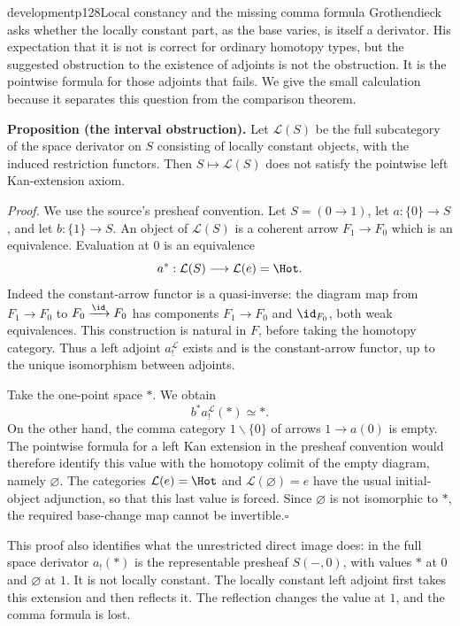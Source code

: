 \begin{dcomment}{development}{p128}{Local constancy and the missing comma formula}
Grothendieck asks whether the locally constant part, as the base varies, is itself a derivator. His expectation that it is not is correct for ordinary homotopy types, but the suggested obstruction to the existence of adjoints is not the obstruction. It is the pointwise formula for those adjoints that fails. We give the small calculation because it separates this question from the comparison theorem.

\textbf{Proposition (the interval obstruction).}\ours
Let $\mathcal L(S)$ be the full subcategory of the space derivator on $S$ consisting of locally constant objects, with the induced restriction functors. Then $S\mapsto\mathcal L(S)$ does not satisfy the pointwise left Kan-extension axiom.

\textit{Proof.} We use the source's presheaf convention. Let $S=(0\to1)$, let $a:\{0\}\to S$, and let $b:\{1\}\to S$. An object of $\mathcal L(S)$ is a coherent arrow $F_1\to F_0$ which is an equivalence. Evaluation at $0$ is an equivalence
\[
 a^*:\mathcal L(S)\longrightarrow\mathcal L(e)=\Hot.
\]
Indeed the constant-arrow functor is a quasi-inverse: the diagram map from $F_1\to F_0$ to $F_0\xrightarrow{\id}F_0$ has components $F_1\to F_0$ and $\id_{F_0}$, both weak equivalences. This construction is natural in $F$, before taking the homotopy category. Thus a left adjoint $a^{\mathcal L}_!$ exists and is the constant-arrow functor, up to the unique isomorphism between adjoints.

Take the one-point space $*$. We obtain
\[
 b^*a^{\mathcal L}_!(*)\simeq *.
\]
On the other hand, the comma category $1\backslash\{0\}$ of arrows $1\to a(0)$ is empty. The pointwise formula for a left Kan extension in the presheaf convention would therefore identify this value with the homotopy colimit of the empty diagram, namely $\varnothing$. The categories $\mathcal L(e)=\Hot$ and $\mathcal L(\varnothing)=e$ have the usual initial-object adjunction, so that this last value is forced. Since $\varnothing$ is not isomorphic to $*$, the required base-change map cannot be invertible.\hfill$\square$

This proof also identifies what the unrestricted direct image does: in the full space derivator $a_!(*)$ is the representable presheaf $S(-,0)$, with values $*$ at $0$ and $\varnothing$ at $1$. It is not locally constant. The locally constant left adjoint first takes this extension and then reflects it. The reflection changes the value at $1$, and the comma formula is lost.


\end{dcomment}

